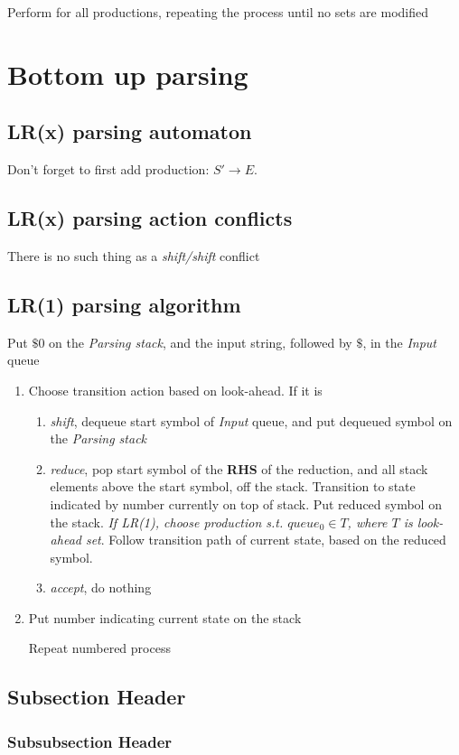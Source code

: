 \documentclass[fontsize=10pt,a4paper]{article}
\begin{document}
\begin{multicols}{3}
    Perform for all productions, repeating the process until no sets are modified

    \section{Bottom up parsing}

    \subsection{LR(x) parsing automaton}

    Don't forget to first add production: $S' \rightarrow E$.

    \subsection{LR(x) parsing action conflicts}

    There is no such thing as a \textit{shift/shift} conflict


    \subsection{LR(1) parsing algorithm}

    Put $\$0$ on the \textit{Parsing stack}, and the input string, followed by $\$$, in the \textit{Input} queue

    \begin{enumerate}
        \item Choose transition action based on look-ahead. If it is
        \begin{enumerate}
            \item \textit{shift}, dequeue start symbol of \textit{Input} queue, and put dequeued symbol on the \textit{Parsing stack}
            \item \textit{reduce}, pop start symbol of the \textbf{RHS} of the reduction, and all stack elements above the start symbol, off the stack. Transition to state indicated by number currently on top of stack. Put reduced symbol on the stack. \textit{If LR(1), choose production s.t. $queue_0 \in T$, where $T$ is look-ahead set}. Follow transition path of current state, based on the reduced symbol.
            \item \textit{accept}, do nothing
        \end{enumerate} 
        \item Put number indicating current state on the stack

    Repeat numbered process

    \end{enumerate}



    \subsection{Subsection Header}
    \subsubsection{Subsubsection Header}

\end{multicols}
\end{document}
